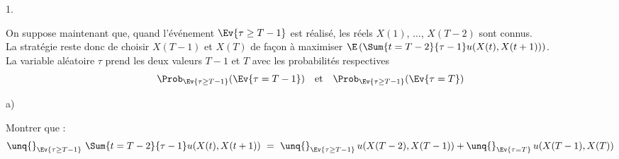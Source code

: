 \documentclass[11pt]{article}%
\begin{document}
\begin{noliste}{1.}
  \item On suppose maintenant que, quand l'événement $\Ev{\tau \geq 
  T-1}$ est réalisé, les réels $X(1)$, $\ldots$, $X(T-2)$ sont connus. 
  \\[.1cm]
  La 
  stratégie reste donc de choisir $X(T-1)$ et $X(T)$ de façon à 
  maximiser $\E\left(\Sum{t=T-2}{\tau-1} u(X(t), 
  X(t+1))\right)$.\\[.1cm]
  La variable aléatoire $\tau$ prend les deux valeurs $T-1$ et $T$ 
  avec les probabilités respectives 
  \[
    \Prob_{\Ev{\tau \geq T-1}}(\Ev{\tau = T-1}) \quad \text{et} 
    \quad \Prob_{\Ev{\tau \geq T-1}}(\Ev{\tau = T})
  \]
  \end{noliste}
  
  
  \newpage
  
  
  \begin{noliste}{a)}
    \setlength{\itemsep}{2mm}
    \item Montrer que :
    \[
      \unq{}_{\Ev{\tau \geq T-1}} \ \Sum{t=T-2}{\tau-1} 
      u(X(t),X(t+1))
      \ = \ \unq{}_{\Ev{\tau \geq T-1}} \, u(X(T-2),X(T-1)) + 
      \unq{}_{\Ev{\tau = T}} \, u(X(T-1),X(T))
    \]
    

\end{noliste}
\end{document}
